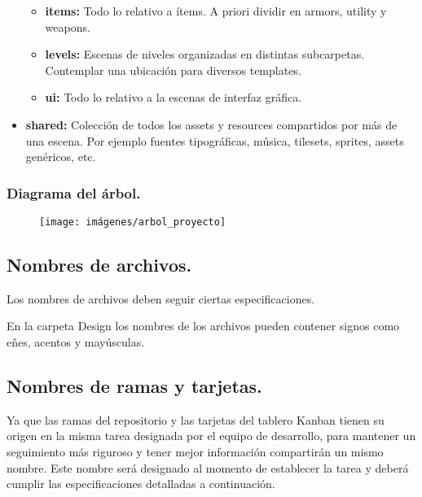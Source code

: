 \begin{itemize}
\begin{itemize}
	\item \textbf{items:} Todo lo relativo a ítems. A priori dividir en armors, utility y weapons.

	\item \textbf{levels:} Escenas de niveles organizadas en distintas subcarpetas. Contemplar una ubicación para diversos templates.

	\item \textbf{ui:} Todo lo relativo a la escenas de interfaz gráfica.
\end{itemize}

\item \textbf{shared:} Colección de todos los assets y resources compartidos por más de una escena. Por ejemplo fuentes tipográficas, música, tilesets, sprites, assets genéricos, etc.
\end{itemize}

\subsubsection*{Diagrama del árbol.}
\begin{figure}[H]
\centering
\texttt{[image: imágenes/arbol\_proyecto]}
\label{fig:arbolproyecto}
\end{figure}









\subsection{Nombres de archivos.}\label{organizacion:nombres-de-archivos}

Los nombres de archivos deben seguir ciertas especificaciones.

En la carpeta Design los nombres de los archivos pueden contener signos como eñes, acentos y mayúsculas.

\subsection{Nombres de ramas y tarjetas.}\label{organizacion:nombres-de-ramas}
Ya que las ramas del repositorio  y las tarjetas del tablero Kanban tienen su origen en la misma tarea designada por el equipo de desarrollo, para mantener un seguimiento más riguroso y tener mejor información compartirán un mismo nombre. Este nombre será designado al momento de establecer la tarea y deberá cumplir las especificaciones detalladas a continuación.


